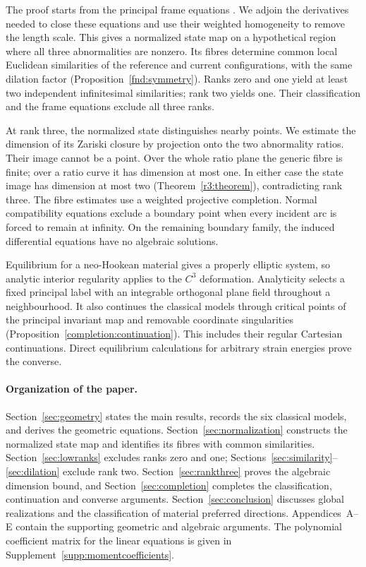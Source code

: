 \documentclass[11pt,a4paper]{article}
\numberwithin{equation}{section}
\theoremstyle{plain}
\theoremstyle{definition}
\theoremstyle{remark}
\begin{document}
The proof starts from the principal frame equations
\cite{Marris1975,Marris1982}. We adjoin the derivatives needed to close
these equations and use their weighted homogeneity to remove the length
scale. This gives a normalized state map on a hypothetical region where
all three abnormalities are nonzero. Its fibres determine common local
Euclidean similarities of the reference and current configurations,
with the same dilation factor (Proposition~\ref{fnd:symmetry}).
Ranks zero and one yield at least two independent infinitesimal
similarities; rank two yields one. Their classification and the frame
equations exclude all three ranks.

At rank three, the normalized state distinguishes nearby points.
We estimate the dimension of its Zariski closure by projection onto the
two abnormality ratios. Their image cannot be a point. Over the whole
ratio plane the generic fibre is finite; over a ratio curve it has
dimension at most one. In either case the state image has dimension
at most two (Theorem~\ref{r3:theorem}), contradicting rank three.
The fibre estimates use a weighted projective completion. Normal
compatibility equations exclude a boundary point when every incident
arc is forced to remain at infinity. On the remaining boundary family,
the induced differential equations have no algebraic solutions.

Equilibrium for a neo-Hookean material gives a properly elliptic
system, so analytic interior regularity
\cite[Theorem~6.8.1]{Morrey1966} applies to the $C^3$ deformation.
Analyticity selects a fixed principal label with an integrable
orthogonal plane field throughout a neighbourhood. It also continues
the classical models through critical points of the principal invariant
map and removable coordinate singularities
(Proposition~\ref{completion:continuation}). This includes their regular
Cartesian continuations. Direct equilibrium calculations for arbitrary
strain energies prove the converse.

\paragraph{Organization of the paper.}
Section~\ref{sec:geometry} states the main results, records the six
classical models, and derives the geometric equations.
Section~\ref{sec:normalization} constructs the normalized state map and
identifies its fibres with common similarities.
Section~\ref{sec:lowranks} excludes ranks zero and one;
Sections~\ref{sec:similarity}--\ref{sec:dilation} exclude rank two.
Section~\ref{sec:rankthree} proves the algebraic dimension bound, and
Section~\ref{sec:completion} completes the classification, continuation
and converse arguments. Section~\ref{sec:conclusion} discusses global
realizations and the classification of material preferred directions.
Appendices~A--E contain the supporting
geometric and algebraic arguments. The polynomial coefficient matrix
for the linear equations is given in Supplement~\ref{supp:momentcoefficients}.
\end{document}
